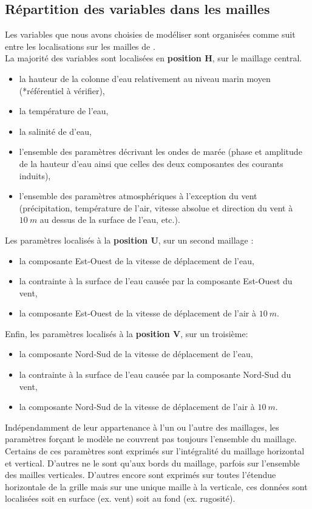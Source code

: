\documentclass[10pt,a4paper,titlepage]{article}
\begin{document}
\subsection{Répartition des variables dans les mailles}
Les variables que nous avons choisies de modéliser sont organisées comme suit entre les localisations sur les mailles de \cite{Arakawa_C-grid_1977}.\\
La majorité des variables sont localisées en \textbf{position H}, sur le maillage central.
\begin{itemize}
    \item la hauteur de la colonne d'eau relativement au niveau marin moyen (*référentiel à vérifier),
    \item la température de l'eau,
    \item la salinité de d'eau,
    \item l'ensemble des paramètres décrivant les ondes de marée (phase et amplitude de la hauteur d'eau ainsi que celles des deux composantes des courants induits),
    \item l'ensemble des paramètres atmosphériques à l'exception du vent (précipitation, température de l'air, vitesse absolue et direction du vent à $10~m$ au dessus de la surface de l'eau, etc.).
\end{itemize}
Les paramètres localisés à la \textbf{position U}, sur un second maillage :
\begin{itemize}
    \item la composante Est-Ouest de la vitesse de déplacement de l'eau,
    \item la contrainte à la surface de l'eau causée par la composante Est-Ouest du vent,
    \item la composante Est-Ouest de la vitesse de déplacement de l'air à $10~m$.
\end{itemize}
Enfin, les paramètres localisés à la \textbf{position V}, sur un troisième:
\begin{itemize}
    \item la composante Nord-Sud de la vitesse de déplacement de l'eau,
    \item la contrainte à la surface de l'eau causée par la composante Nord-Sud du vent,
    \item la composante Nord-Sud de la vitesse de déplacement de l'air à $10~m$.
\end{itemize}

Indépendamment de leur appartenance à l'un ou l'autre des maillages, les paramètres forçant le modèle ne couvrent pas toujours l'ensemble du maillage.
Certains de ces paramètres sont exprimés sur l'intégralité du maillage horizontal et vertical.
D'autres ne le sont qu'aux bords du maillage, parfois sur l'ensemble des mailles verticales.
D'autres encore sont exprimés sur toutes l'étendue horizontale de la grille mais sur une unique maille à la verticale, ces données sont localisées soit en surface (ex. vent) soit au fond (ex. rugosité).
\end{document}
